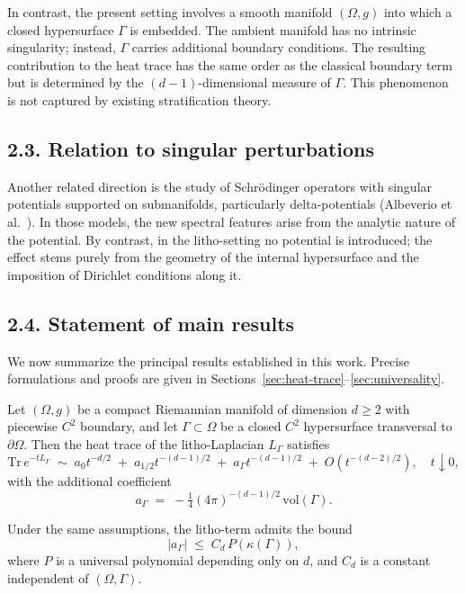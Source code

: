 In contrast, the present setting involves a smooth manifold $(\Omega,g)$ into which a closed hypersurface $\Gamma$ is embedded. 
The ambient manifold has no intrinsic singularity; instead, $\Gamma$ carries additional boundary conditions. 
The resulting contribution to the heat trace has the same order as the classical boundary term but is determined by the $(d-1)$-dimensional measure of $\Gamma$. 
This phenomenon is not captured by existing stratification theory.

\subsection*{2.3. Relation to singular perturbations}
Another related direction is the study of Schrödinger operators with singular potentials supported on submanifolds, particularly delta-potentials (Albeverio et al.~\cite{Albeverio04}). 
In those models, the new spectral features arise from the analytic nature of the potential. 
By contrast, in the litho-setting no potential is introduced; the effect stems purely from the geometry of the internal hypersurface and the imposition of Dirichlet conditions along it.

\subsection*{2.4. Statement of main results}
We now summarize the principal results established in this work. 
Precise formulations and proofs are given in Sections~\ref{sec:heat-trace}--\ref{sec:universality}.

\begin{theorem}\label{thm:localized}
Let $(\Omega,g)$ be a compact Riemannian manifold of dimension $d \geq 2$ with piecewise $C^2$ boundary, and let $\Gamma \subset \Omega$ be a closed $C^2$ hypersurface transversal to $\partial \Omega$. 
Then the heat trace of the litho-Laplacian $L_\Gamma$ satisfies
\[
\mathrm{Tr}\, e^{-t L_\Gamma} \;\sim\; a_0 t^{-d/2} \;+\; a_{1/2} t^{-(d-1)/2} \;+\; a_\Gamma t^{-(d-1)/2} \;+\; O(t^{-(d-2)/2}),
\quad t \downarrow 0,
\]
with the additional coefficient
\[
a_\Gamma \;=\; -\tfrac{1}{4}(4\pi)^{-(d-1)/2} \, \mathrm{vol}(\Gamma).
\]
\end{theorem}

\begin{theorem}\label{thm:poly}
Under the same assumptions, the litho-term admits the bound
\[
|a_\Gamma| \;\leq\; C_d \, P(\kappa(\Gamma)),
\]
where $P$ is a universal polynomial depending only on $d$, and $C_d$ is a constant independent of $(\Omega,\Gamma)$.
\end{theorem}

